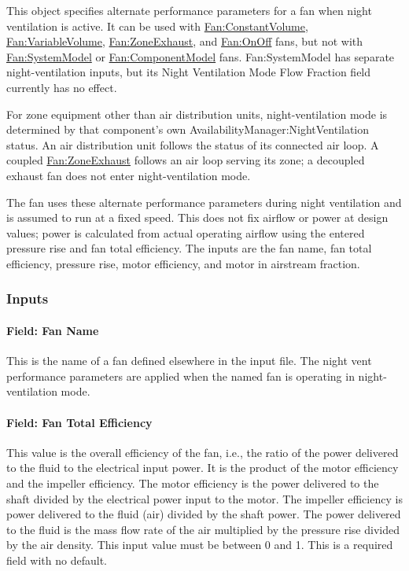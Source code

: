 This object specifies alternate performance parameters for a fan when night ventilation is active. It can be used with \hyperref[fanconstantvolume]{Fan:ConstantVolume}, \hyperref[fanvariablevolume]{Fan:VariableVolume}, \hyperref[fanzoneexhaust]{Fan:ZoneExhaust}, and \hyperref[fanonoff]{Fan:OnOff} fans, but not with \hyperref[fansystemmodel]{Fan:SystemModel} or \hyperref[fancomponentmodel]{Fan:ComponentModel} fans. Fan:SystemModel has separate night-ventilation inputs, but its Night Ventilation Mode Flow Fraction field currently has no effect.

For zone equipment other than air distribution units, night-ventilation mode is determined by that component's own AvailabilityManager:NightVentilation status. An air distribution unit follows the status of its connected air loop. A coupled \hyperref[fanzoneexhaust]{Fan:ZoneExhaust} follows an air loop serving its zone; a decoupled exhaust fan does not enter night-ventilation mode.

The fan uses these alternate performance parameters during night ventilation and is assumed to run at a fixed speed. This does not fix airflow or power at design values; power is calculated from actual operating airflow using the entered pressure rise and fan total efficiency. The inputs are the fan name, fan total efficiency, pressure rise, motor efficiency, and motor in airstream fraction.

\subsubsection{Inputs}\label{inputs-4-013}

\paragraph{Field: Fan Name}\label{field-fan-name-001}

This is the name of a fan defined elsewhere in the input file. The night vent performance parameters are applied when the named fan is operating in night-ventilation mode.

\paragraph{Field: Fan Total Efficiency}\label{field-fan-total-efficiency-4}

This value is the overall efficiency of the fan, i.e., the ratio of the power delivered to the fluid to the electrical input power. It is the product of the motor efficiency and the impeller efficiency. The motor efficiency is the power delivered to the shaft divided by the electrical power input to the motor. The impeller efficiency is power delivered to the fluid (air) divided by the shaft power. The power delivered to the fluid is the mass flow rate of the air multiplied by the pressure rise divided by the air density. This input value must be between 0 and 1. This is a required field with no default.

